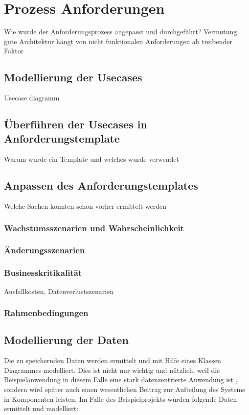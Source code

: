 \chapter{Prozess Anforderungen}
Wie wurde der Anforderungsprozess angepasst und durchgeführt? Vermutung gute Architektur hängt von nicht funktionalen Anforderungen ab treibender Faktor

\section{Modellierung der Usecases}
Usecase diagramm

\section{Überführen der Usecases in Anforderungstemplate}
Warum wurde ein Template und welches wurde verwendet

\section{Anpassen des Anforderungstemplates}
Welche Sachen konnten schon vorher ermittelt werden
\subsection{Wachstumsszenarien und Wahrscheinlichkeit}
\subsection{Änderungsszenarien}
\subsection{Businesskritikalität}
Ausfallkosten, Datenverlustszenarien
\subsection{Rahmenbedingungen}

\section{Modellierung der Daten}
Die zu speichernden Daten werden ermittelt und mit Hilfe eines Klassen Diagrammes modelliert. Dies ist nicht nur wichtig und nützlich, weil die Beispielanwendung in diesem Falle eine stark datenzentrierte Anwendung ist \cite[S. 105]{effektiv}, sondern wird später auch einen wesentlichen Beitrag zur Aufteilung des Systems in Komponenten leisten. Im Falle des Beispielprojekts wurden folgende Daten ermittelt und modelliert:

